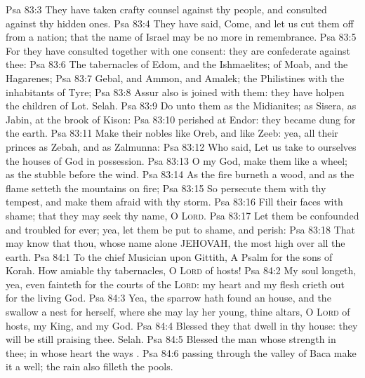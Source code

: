 \vs Psa 83:3 They have taken crafty counsel against thy people, and consulted against thy hidden ones.
\vs Psa 83:4 They have said, Come, and let us cut them off from  a nation; that the name of Israel may be no more in remembrance.
\vs Psa 83:5 For they have consulted together with one consent: they are confederate against thee:
\vs Psa 83:6 The tabernacles of Edom, and the Ishmaelites; of Moab, and the Hagarenes;
\vs Psa 83:7 Gebal, and Ammon, and Amalek; the Philistines with the inhabitants of Tyre;
\vs Psa 83:8 Assur also is joined with them: they have holpen the children of Lot. Selah.
\vs Psa 83:9 Do unto them as  the Midianites; as  Sisera, as  Jabin, at the brook of Kison:
\vs Psa 83:10  perished at Endor: they became  dung for the earth.
\vs Psa 83:11 Make their nobles like Oreb, and like Zeeb: yea, all their princes as Zebah, and as Zalmunna:
\vs Psa 83:12 Who said, Let us take to ourselves the houses of God in possession.
\vs Psa 83:13 O my God, make them like a wheel; as the stubble before the wind.
\vs Psa 83:14 As the fire burneth a wood, and as the flame setteth the mountains on fire;
\vs Psa 83:15 So persecute them with thy tempest, and make them afraid with thy storm.
\vs Psa 83:16 Fill their faces with shame; that they may seek thy name, O \textsc{Lord}.
\vs Psa 83:17 Let them be confounded and troubled for ever; yea, let them be put to shame, and perish:
\vs Psa 83:18 That  may know that thou, whose name alone  JEHOVAH,  the most high over all the earth.
\vs Psa 84:1 To the chief Musician upon Gittith, A Psalm for the sons of Korah. How amiable  thy tabernacles, O \textsc{Lord} of hosts!
\vs Psa 84:2 My soul longeth, yea, even fainteth for the courts of the \textsc{Lord}: my heart and my flesh crieth out for the living God.
\vs Psa 84:3 Yea, the sparrow hath found an house, and the swallow a nest for herself, where she may lay her young,  thine altars, O \textsc{Lord} of hosts, my King, and my God.
\vs Psa 84:4 Blessed  they that dwell in thy house: they will be still praising thee. Selah.
\vs Psa 84:5 Blessed  the man whose strength  in thee; in whose heart  the ways .
\vs Psa 84:6  passing through the valley of Baca make it a well; the rain also filleth the pools.
